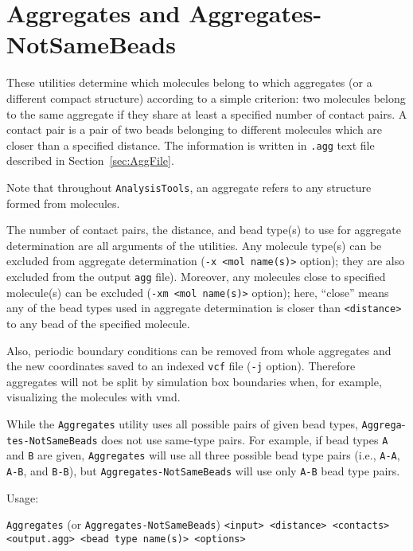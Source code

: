 \section{Aggregates and Aggregates-NotSameBeads} \label{sec:Aggregates}

These utilities determine which molecules belong to which aggregates (or a
different compact structure) according to a simple criterion: two molecules
belong to the same aggregate if they share at least a specified number of
contact pairs. A contact pair is a pair of two beads belonging to different
molecules which are closer than a specified distance. The information is
written in \texttt{.agg} text file described in Section~\ref{sec:AggFile}.

Note that throughout \texttt{AnalysisTools}, an aggregate refers to any
structure formed from molecules.

The number of contact pairs, the distance, and bead type(s) to use for
aggregate determination are all arguments of the utilities.  Any molecule
type(s) can be excluded from aggregate determination (\texttt{-x <mol
name(s)>} option); they are also excluded from the output \texttt{agg}
file).  Moreover, any molecules close to specified molecule(s) can be
excluded (\texttt{-xm <mol name(s)>} option); here, \enquote{close} means
any of the bead types used in aggregate determination is closer than
\texttt{<distance>} to any bead of the specified molecule.

Also, periodic boundary conditions can be removed from whole aggregates and
the new coordinates saved to an indexed \texttt{vcf} file (\texttt{-j}
option). Therefore aggregates will not be split by simulation box
boundaries when, for example, visualizing the molecules with vmd.

While the \texttt{Aggregates} utility uses all possible pairs of given bead
types, \texttt{Aggrega}-\texttt{tes-NotSameBeads} does not use same-type pairs. For
example, if bead types \texttt{A} and \texttt{B} are given,
\texttt{Aggregates} will use all three possible bead type pairs (i.e.,
\texttt{A-A}, \texttt{A-B}, and \texttt{B-B}), but
\texttt{Aggregates-NotSameBeads} will use only \texttt{A-B} bead type
pairs.

Usage:

\noindent
\vspace{1em}
\texttt{Aggregates} (or \texttt{Aggregates-NotSameBeads})
\texttt{<input> <distance> <contacts> <output.agg> <bead type name(s)>
<options>}

